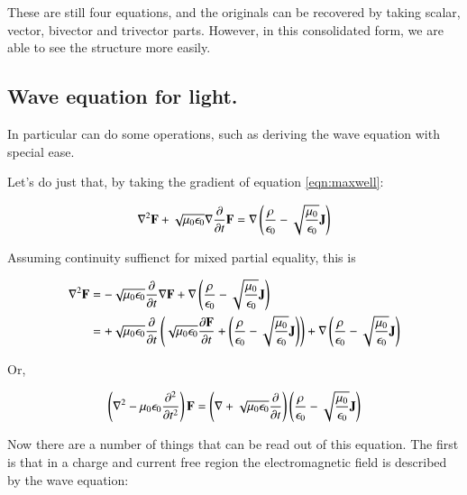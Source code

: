 \documentclass{article}      %
\newcommand{\grad}[0]{\nabla}
\begin{document}
These are still four equations, and the originals can be recovered by taking scalar, vector, bivector and trivector parts.  However, in this
consolidated form, we are able to see the structure more easily.

\subsection{ Wave equation for light. }

In particular can do some operations, such as deriving the wave equation
with special ease.

Let's do just that, by taking the gradient of equation \ref{eqn:maxwell}:

\begin{equation*}
\grad^2 \BF + \sqrt{\mu_0\epsilon_0}\grad \frac{\partial}{\partial t} \BF =
\grad \left(\frac{\rho}{\epsilon_0} - \sqrt{\frac{\mu_0}{\epsilon_0}} \BJ\right)
\end{equation*}


Assuming continuity suffienct for mixed partial equality, this is

\begin{align*}
\grad^2 \BF
&= - \sqrt{\mu_0\epsilon_0}\frac{\partial}{\partial t} \grad \BF + \grad \left(\frac{\rho}{\epsilon_0} - \sqrt{\frac{\mu_0}{\epsilon_0}} \BJ\right) \\
&= + \sqrt{\mu_0\epsilon_0}\frac{\partial}{\partial t}
\left(\sqrt{\mu_0\epsilon_0}\frac{\partial \BF}{\partial t} + \left(\frac{\rho}{\epsilon_0} - \sqrt{\frac{\mu_0}{\epsilon_0}} \BJ \right)\right)
 + \grad \left(\frac{\rho}{\epsilon_0} - \sqrt{\frac{\mu_0}{\epsilon_0}} \BJ\right) \\
\end{align*}

Or,

\begin{equation}
\left(\grad^2 - \mu_0\epsilon_0 \frac{\partial^2}{\partial t^2} \right) \BF =
\left(\grad + \sqrt{\mu_0\epsilon_0}\frac{\partial}{\partial t}\right)
\left(\frac{\rho}{\epsilon_0} - \sqrt{\frac{\mu_0}{\epsilon_0}} \BJ \right)
\end{equation}

Now there are a number of things that can be read out of this equation.  The first is that in a charge and current free region the electromagnetic field is described by the
wave equation:
\end{document}
